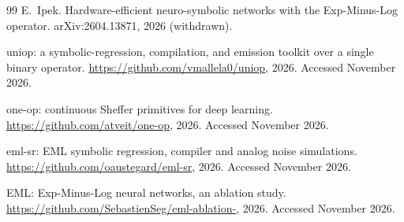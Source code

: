 \documentclass[11pt]{article}
\begin{document}
\begin{thebibliography}{99}
E.~Ipek.
\newblock Hardware-efficient neuro-symbolic networks with the Exp-Minus-Log
  operator.
\newblock arXiv:2604.13871, 2026 (withdrawn).

uniop: a symbolic-regression, compilation, and emission toolkit over a single
  binary operator.
\newblock \url{https://github.com/vmallela0/uniop}, 2026. Accessed November 2026.

one-op: continuous Sheffer primitives for deep learning.
\newblock \url{https://github.com/atveit/one-op}, 2026. Accessed November 2026.

eml-sr: EML symbolic regression, compiler and analog noise simulations.
\newblock \url{https://github.com/oaustegard/eml-sr}, 2026. Accessed November 2026.

EML: Exp-Minus-Log neural networks, an ablation study.
\newblock \url{https://github.com/SebastienSeg/eml-ablation-}, 2026. Accessed November 2026.
\end{thebibliography}
\end{document}

